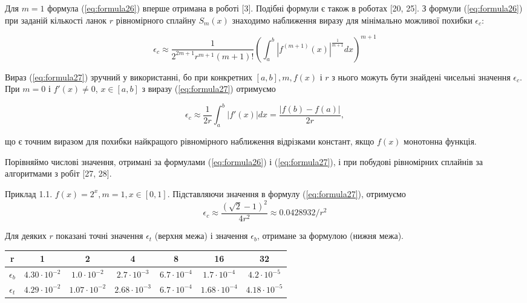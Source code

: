\documentclass[ukrainian,14pt]{extarticle}
\begin{document}
Для $m = 1$ формула (\ref{eq:formula26}) вперше отримана в роботі [3].
Подібні формули є також в роботах [20, 25]. З формули (\ref{eq:formula26}) при заданій кількості ланок $r$ рівномірного сплайну $S_m(x)$ знаходимо наближення виразу для мінімально можливої похибки $\epsilon_c$: 

\begin{equation}\label{eq:formula27}
  \epsilon_c \approx \frac{1}{2^{2m+1} r^{m+1} (m+1)!} \left( \int_a^b \left|f^{(m+1)}(x)\right|^{\frac{1}{m+1} }dx \right)^{m+1}  
\end{equation}

Вираз (\ref{eq:formula27}) зручний у використанні, бо при конкретних $[a, b], m, f(x)$ і $r$ з нього можуть бути знайдені чисельні значення $\epsilon_c$. При $m = 0$ і $f'(x) \neq 0$, $x \in [a, b]$ з виразу (\ref{eq:formula27}) отримуємо

\begin{equation}\label{eq:formula28}
    \epsilon_c \approx \frac{1}{2r} \int_a^b |f'(x)|dx = \frac{|f(b) - f(a)|}{2r},
\end{equation}

що є точним виразом для похибки найкращого рівномірного наближення відрізками констант, якщо $f(x)$ монотонна функція.

Порівняймо числові значення, отримані за формулами (\ref{eq:formula26}) і (\ref{eq:formula27}), і при побудові рівномірних сплайнів за алгоритмами з робіт [27, 28].

\vspace{1cm}

Приклад 1.1. $f(x) = 2^x, m = 1, x \in [0, 1]$. Підставляючи значення в формулу (\ref{eq:formula27}), отримуємо
$$\epsilon_c \approx \frac{(\sqrt{2} - 1)^2}{4r^2} \approx 0.0428932 / r^2$$

Для деяких $r$ показані точні значення $\epsilon_t$ (верхня межа) і значення $\epsilon_b$, отримане за формулою (нижня межа).

\bgroup
\def\arraystretch{1.5}%
\begin{center}
\begin{tabular}{ c | c |
c | c | c | c | c }
 r & 1 & 2 & 4 & 8 & 16 & 32 \\
 \hline
 $\epsilon_b$ & $4.30 \cdot 10^{-2}$ & $1.0 \cdot 10^{-2}$ & $2.7 \cdot 10^{-3}$ & $6.7 \cdot 10^{-4}$ & $1.7 \cdot 10^{-4}$ & $4.2 \cdot 10^{-5}$ \\  
 \hline
 $\epsilon_t$ & $4.29 \cdot 10^{-2}$ & $1.07 \cdot 10^{-2}$ & $2.68 \cdot 10^{-3}$ & $6.7 \cdot 10^{-4}$ & $1.68 \cdot 10^{-4}$ & $4.18 \cdot 10^{-5}$    
\end{tabular}
\end{center}
\egroup
\end{document}
